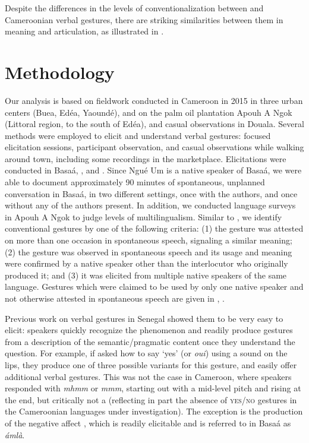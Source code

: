 \documentclass[output=paper,newtxmath,modfonts,nonflat,hidelinks]{langsci/langscibook}
\begin{document}
Despite the differences in the levels of conventionalization between  and Cameroonian verbal gestures, there are striking similarities between them in meaning and articulation, as illustrated in . 


\section{Methodology}

Our analysis is based on fieldwork conducted in Cameroon in 2015 in three urban centers (Buea, Ed\'{e}a, Yaound\'{e}), and on the palm oil plantation Apouh A Ngok (Littoral region, to the south of Ed\'{e}a), and casual observations in Douala.  Several methods were employed to elicit and understand verbal gestures: focused elicitation sessions, participant observation, and casual observations while walking around town, including some recordings in the marketplace. Elicitations were conducted in Basa\'{a}, , and . Since Ngu\'{e} Um is a native speaker of Basa\'{a}, we were able to document approximately 90 minutes of spontaneous, unplanned conversation in Basa\'{a}, in two different settings, once with the authors, and once without any of the authors present. In addition, we conducted language surveys in Apouh A Ngok to judge levels of multilingualism. Similar to \citet[191]{brookes2004}, we identify conventional gestures by one of the following criteria: (1) the gesture was attested on more than one occasion in spontaneous speech, signaling a similar meaning; (2) the gesture was observed in spontaneous speech and its usage and meaning were confirmed by a native speaker other than the interlocutor who originally produced it; and (3) it was elicited from multiple native speakers of the same language. Gestures which were claimed to be used by only one native speaker and not otherwise attested in spontaneous speech are given in , .

Previous work on  verbal gestures in Senegal showed them to be very easy to elicit:  speakers quickly recognize the phenomenon and readily produce gestures from a description of the semantic/pragmatic content once they understand the question. For example, if asked how to say `yes' (or \textit{oui}) using a sound on the lips, they produce one of three possible  variants for this gesture, and easily offer additional verbal gestures. This was not the case in Cameroon, where speakers responded with \textit{mhmm} or \textit{mmm}, starting out with a mid-level pitch and rising at the end, but critically not a  (reflecting in part the absence of \textsc {yes/no} gestures in the Cameroonian languages under investigation).  The exception is the production of the negative affect , which is readily elicitable and is referred to in Basa\'{a} as \textit{\tS\'{a}ml\`{a}}.
\end{document}
